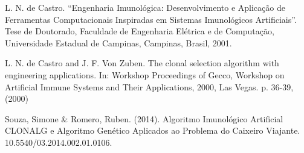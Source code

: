 \documentclass[conference]{IEEEtran}
\begin{document}
\begin{thebibliography}{00}

 L.  N.  de  Castro.  “Engenharia  Imunológica:  Desenvolvimento  e  Aplicação  de  Ferramentas Computacionais  Inspiradas  em  Sistemas  Imunológicos  Artificiais”.  Tese  de  Doutorado,  Faculdade  de Engenharia Elétrica e de Computação, Universidade Estadual de Campinas, Campinas, Brasil, 2001.

 L. N. de Castro and J. F. Von Zuben.  The clonal selection algorithm with engineering applications. In: Workshop Proceedings of Gecco, Workshop on Artificial Immune Systems and Their Applications, 2000, Las Vegas. p. 36-39, (2000)

 Souza, Simone & Romero, Ruben. (2014). Algoritmo Imunológico Artificial CLONALG e Algoritmo Genético Aplicados ao Problema do Caixeiro Viajante. 10.5540/03.2014.002.01.0106. 
\end{thebibliography}
\end{document}
